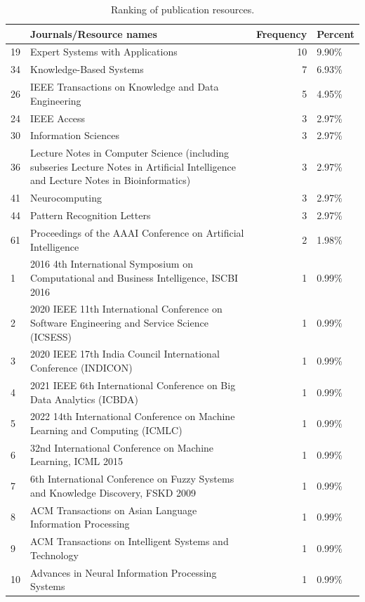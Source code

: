 \documentclass[
]{article}
\begin{document}
\begin{table}

\caption{\label{tab:bibliochecking9}Ranking of publication resources.}
\centering
\begin{tabular}[t]{l|l|r|l}
\hline
  & Journals/Resource names & Frequency & Percent\\
\hline
19 & Expert Systems with Applications & 10 & 9.90\%\\
\hline
34 & Knowledge-Based Systems & 7 & 6.93\%\\
\hline
26 & IEEE Transactions on Knowledge and Data Engineering & 5 & 4.95\%\\
\hline
24 & IEEE Access & 3 & 2.97\%\\
\hline
30 & Information Sciences & 3 & 2.97\%\\
\hline
36 & Lecture Notes in Computer Science (including subseries Lecture Notes in Artificial Intelligence and Lecture Notes in Bioinformatics) & 3 & 2.97\%\\
\hline
41 & Neurocomputing & 3 & 2.97\%\\
\hline
44 & Pattern Recognition Letters & 3 & 2.97\%\\
\hline
61 & Proceedings of the AAAI Conference on Artificial Intelligence & 2 & 1.98\%\\
\hline
1 & 2016 4th International Symposium on Computational and Business Intelligence, ISCBI 2016 & 1 & 0.99\%\\
\hline
2 & 2020 IEEE 11th International Conference on Software Engineering and Service Science (ICSESS) & 1 & 0.99\%\\
\hline
3 & 2020 IEEE 17th India Council International Conference (INDICON) & 1 & 0.99\%\\
\hline
4 & 2021 IEEE 6th International Conference on Big Data Analytics (ICBDA) & 1 & 0.99\%\\
\hline
5 & 2022 14th International Conference on Machine Learning and Computing (ICMLC) & 1 & 0.99\%\\
\hline
6 & 32nd International Conference on Machine Learning, ICML 2015 & 1 & 0.99\%\\
\hline
7 & 6th International Conference on Fuzzy Systems and Knowledge Discovery, FSKD 2009 & 1 & 0.99\%\\
\hline
8 & ACM Transactions on Asian Language Information Processing & 1 & 0.99\%\\
\hline
9 & ACM Transactions on Intelligent Systems and Technology & 1 & 0.99\%\\
\hline
10 & Advances in Neural Information Processing Systems & 1 & 0.99\%\\

\end{tabular}
\end{table}
\end{document}
